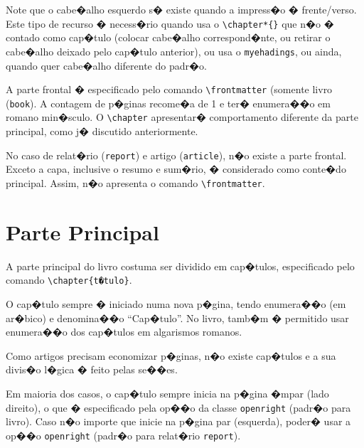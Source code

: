 \documentclass[12pt,a4paper,oneside, openany, titlepage]{book}
\begin{document}
Note que o cabe�alho esquerdo s� existe quando a impress�o � frente/verso.
Este tipo de recurso � necess�rio quando usa o \verb+\chapter*{}+
que n�o � contado como cap�tulo (colocar cabe�alho correspond�nte, 
ou retirar o cabe�alho deixado pelo cap�tulo anterior),
ou usa o \texttt{myehadings}, ou ainda, quando quer cabe�alho 
diferente do padr�o.

A parte frontal � especificado pelo comando \verb+\frontmatter+ 
(somente livro (\texttt{book}). 
A contagem de p�ginas recome�a de 1 e ter� enumera��o em romano min�sculo. 
O \verb+\chapter+ apresentar� comportamento diferente da parte principal,
como j� discutido anteriormente.

No caso de relat�rio (\texttt{report}) e artigo (\texttt{article}), 
n�o existe a parte frontal. 
Exceto a capa, inclusive o resumo e sum�rio, � considerado como 
conte�do principal.
Assim, n�o apresenta o comando \verb+\frontmatter+.

\chapter{Parte Principal}  \label{chap:main}

A parte principal do livro costuma ser dividido em cap�tulos, 
especificado pelo comando \verb+\chapter{t�tulo}+.

O cap�tulo sempre � iniciado numa nova p�gina, tendo enumera��o 
(em ar�bico) e denomina��o ``Cap�tulo''. 
No livro, tamb�m � permitido usar enumera��o dos cap�tulos em 
algarismos romanos.

Como artigos precisam economizar p�ginas,
n�o existe cap�tulos e a sua divis�o l�gica � feito pelas se��es.

Em maioria dos casos, o cap�tulo sempre inicia na p�gina �mpar (lado direito), 
o que � especificado pela op��o da classe
\texttt{openright} (padr�o para livro). 
Caso n�o importe que inicie na p�gina par (esquerda), 
poder� usar a op��o \texttt{openright} (padr�o para relat�rio \texttt{report}).
\end{document}

